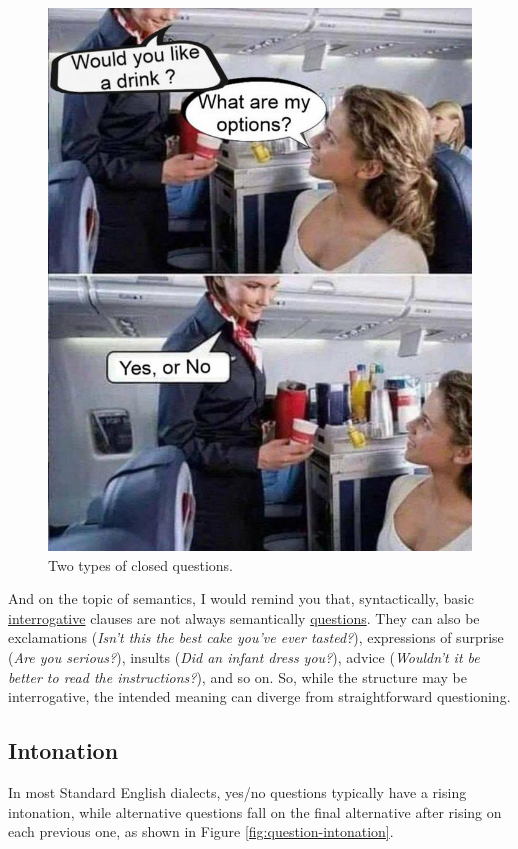 \begin{figure}
    \centering
    \includegraphics[width=0.5\linewidth]{figures/closedInterrogativesMeme.jpg}
    \caption{Two types of closed questions.}
    \label{fig:closed-int-meme}
\end{figure}

And on the topic of semantics, I would remind you that, syntactically, basic \uline{interrogative} clauses are not always semantically \uline{questions}. They can also be exclamations (\textit{Isn't this the best cake you've ever tasted?}), expressions of surprise (\textit{Are you serious?}), insults (\textit{Did an infant dress you?}), advice (\textit{Wouldn't it be better to read the instructions?}), and so on. So, while the structure may be interrogative, the intended meaning can diverge from straightforward questioning.

\subsection{Intonation}

In most Standard English dialects, yes/no questions typically have a rising intonation, while alternative questions fall on the final alternative after rising on each previous one, as shown in Figure \ref{fig:question-intonation}.

